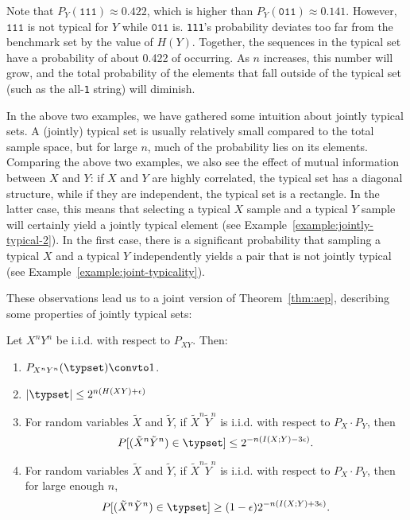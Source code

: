 \begin{example}
\begin{center}
\end{center}
Note that $P_Y(\texttt{111}) \approx 0.422$, which is higher than $P_Y(\texttt{011}) \approx 0.141$. However, $\texttt{111}$ is not typical for $Y$ while $\texttt{011}$ is. \texttt{111}'s probability deviates too far from the benchmark set by the value of $H(Y)$. Together, the sequences in the typical set have a probability of about 0.422 of occurring. As $n$ increases, this number will grow, and the total probability of the elements that fall outside of the typical set (such as the all-\texttt{1} string) will diminish.
\end{example}

In the above two examples, we have gathered some intuition about jointly typical sets. A (jointly) typical set is usually relatively small compared to the total sample space, but for large $n$, much of the probability lies on its elements. Comparing the above two examples, we also see the effect of mutual information between $X$ and $Y$: if $X$ and $Y$ are highly correlated, the typical set has a diagonal structure, while if they are independent, the typical set is a rectangle. In the latter case, this means that selecting a typical $X$ sample and a typical $Y$ sample will certainly yield a jointly typical element (see Example~\ref{example:jointly-typical-2}). In the first case, there is a significant probability that sampling a typical $X$ and a typical $Y$ independently yields a pair that is not jointly typical (see Example~\ref{example:joint-typicality}).

These observations lead us to a joint version of Theorem~\ref{thm:aep}, describing some properties of jointly typical sets:

\begin{theorem}\label{thm:joint-aep}
Let $X^nY^n$ be i.i.d. with respect to $P_{XY}$. Then:
\begin{enumerate}
\item $P_{X^nY^n}(\typset) \convto 1$.
\item $|\typset| \leq 2^{n(H(XY) + \epsilon)}$
\item For random variables $\tilde{X}$ and $\tilde{Y}$, if $\tilde{X}^n\tilde{Y}^n$ is i.i.d. with respect to $P_X \cdot P_Y$, then
\[P[(\tilde{X}^n\tilde{Y}^n) \in \typset] \leq 2^{-n(I(X;Y) - 3\epsilon)}.\]
\item For random variables $\tilde{X}$ and $\tilde{Y}$, if $\tilde{X}^n\tilde{Y}^n$ is i.i.d. with respect to $P_X \cdot P_Y$, then for large enough $n$, \[P[(\tilde{X}^n\tilde{Y}^n) \in \typset] \geq (1-\epsilon)2^{-n(I(X;Y) + 3 \epsilon)}.\]
\end{enumerate}
\end{theorem}

